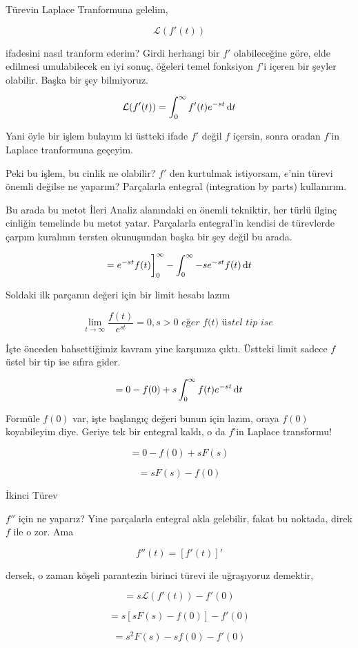\documentclass[12pt,fleqn]{article}\usepackage{../../common}
\begin{document}
Türevin Laplace Tranformuna gelelim,

$$ \mathcal{L}(f'(t)) $$

ifadesini nasıl tranform ederim? Girdi herhangi bir $f'$ olabileceğine
göre, elde edilmesi umulabilecek en iyi sonuç, öğeleri temel fonksiyon
$f$'i içeren bir şeyler olabilir. Başka bir şey bilmiyoruz. 

$$ \mathcal{L}(f'(t)) = \int_0^{\infty} f'(t)e^{-st} \,\mathrm{d} t $$

Yani öyle bir işlem bulayım ki üstteki ifade $f'$ değil $f$ içersin, sonra
oradan $f$'in Laplace tranformuna geçeyim. 

Peki bu işlem, bu cinlik ne olabilir? $f'$ den kurtulmak istiyorsam,
$e$'nin türevi önemli değilse ne yaparım? Parçalarla entegral (integration
by parts) kullanırım. 

Bu arada bu metot İleri Analiz alanındaki en önemli tekniktir, her türlü
ilginç cinliğin temelinde bu metot yatar. Parçalarla entegral'in kendisi de
türevlerde çarpım kuralının tersten okunuşundan başka bir şey değil bu arada.

$$
= e^{-st}f(t) \bigg]_{0}^{\infty}  - \int_{0}^{\infty} -s e^{-st}f(t)\,\mathrm{d} t
$$

Soldaki ilk parçanın değeri için bir limit hesabı lazım

$$ \lim_{t \to \infty} \frac{f(t)}{e^{st}} = 0, s>0
\textit{ eğer f(t) üstel tip ise }
$$

İşte önceden bahsettiğimiz kavram yine karşımıza çıktı. Üstteki limit
sadece $f$ üstel bir tip ise sıfıra gider. 

$$
=  0 - f(0) + s \int_0^{\infty} f(t)e^{-st} \,\mathrm{d} t
$$

Formüle $f(0)$ var, işte başlangıç değeri bunun için lazım, oraya $f(0)$
koyabileyim diye. Geriye tek bir entegral kaldı, o da $f$'in Laplace
transformu! 

$$=  0 - f(0) + s F(s) $$

$$=  s F(s) - f(0) $$

İkinci Türev

$f''$ için ne yaparız? Yine parçalarla entegral akla gelebilir, fakat bu
noktada, direk $f$ ile o zor. Ama 

$$ f''(t) = [f'(t)]' $$

dersek, o zaman köşeli parantezin birinci türevi ile uğraşıyoruz demektir,

$$ = s \mathcal{L} (f'(t)) - f'(0)$$

$$ =  s[sF(s) -f(0)] - f'(0)$$

$$ =  s^2F(s) - sf(0) - f'(0)$$
\end{document}
